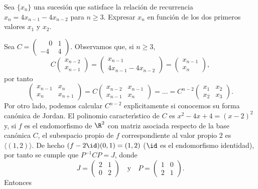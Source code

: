 \begin{exercise}\label{ej:Recurrencia}
Sea $\{x_n\}$ una sucesi\'on que satisface la relaci\'on de recurrencia $x_n=4x_{n-1}-4x_{n-2}$ para $n\geq 3$. Expresar $x_n$ en funci\'on de los dos primeros valores $x_1$ y $x_2$.
\end{exercise}

\begin{solution}
Sea $C=\begin{pmatrix}\phantom{-}0&1\\-4&4\end{pmatrix}$. Observamos que, si $n\geq 3$,
$$C\begin{pmatrix}x_{n-2}\\ x_{n-1}\end{pmatrix}=
\begin{pmatrix}x_{n-1}\\ 4x_{n-1}-4x_{n-2}\end{pmatrix}
=\begin{pmatrix}x_{n-1}\\ x_n\end{pmatrix},$$
por tanto
\begin{equation}\label{RelacionMatricial}\begin{pmatrix}x_{n-1}&x_n\\ x_n&x_{n+1}\end{pmatrix}=
C\begin{pmatrix}x_{n-2}&x_{n-1}\\ x_{n-1}&x_n\end{pmatrix}=\dots =
C^{n-2}\begin{pmatrix}x_1&x_2\\ x_2&x_3\end{pmatrix}.\end{equation}
Por otro lado, podemos calcular $C^{n-2}$ expl\'\i citamente si conocemos su forma can\'onica de Jordan. El polinomio caracter\'\i stico de $C$ es $x^2-4x+4=(x-2)^2$ y, si $f$ es el endomorfismo de $\R^2$ con matriz asociada respecto de la base can\'onica $C$, el subespacio propio de $f$ correspondiente al valor propio $2$ es $\langle (1,2)\rangle$. De hecho $(f-2\id)(0,1)=(1,2)$ ($\id$ es el endomorfismo identidad), por tanto se cumple que $P^{-1}CP=J$, donde
$$J=\begin{pmatrix} 2&1\\ 0&2\end{pmatrix}\quad\text{y}\quad P=\begin{pmatrix} 1&0\\ 2&1\end{pmatrix}.$$ Entonces

\end{solution}
